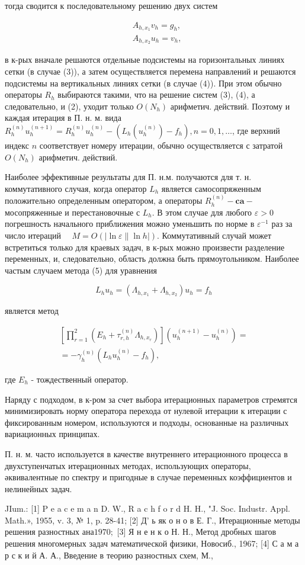 \documentclass[10pt]{article}
\begin{document}
тогда сводится к последовательному решению двух систем

\[
\begin{aligned}
& A_{h, x_{1}} v_{h}=g_{h}, \\
& A_{h, x_{2}} u_{h}=v_{h},
\end{aligned}
\]

в к-рых вначале решаются отдельные подсистемы на горизонтальных линиях сетки (в случае (3)), а затем осуществляется перемена направлений и решаются подсистемы на вертикальных линиях сетки (в случае (4)). При этом обычно операторы $R_{h}$ выбираются такими, что на решение систем (3), (4), а следовательно, и (2), уходит только $O\left(N_{h}\right)$ арифметич. действий. Поэтому и каждая итерация в П. н. м. вида $R_{h}^{(n)} u_{h}^{(n+1)}=R_{h}^{(n)} u_{h}^{(n)}-\left(L_{h}\left(u_{h}^{(n)}\right)-f_{h}\right), n=0,1, \ldots$, где верхний индекс $n$ соответствует номеру итерации, обычно осуществляется с затратой $O\left(N_{h}\right)$ арифметич. действий.

Наиболее эффективные результаты для П. н.м. получаются для т. н. коммутативного случая, когда оператор $L_{h}$ является самосопряженным положительно определенным оператором, а операторы $R_{h}^{(n)}-\mathbf{c a}-$ мосопряженные и перестановочные с $L_{h}$. В этом случае для любого $\varepsilon>0$ погрешность начального приближения можно уменьшить по норме в $\varepsilon^{-1}$ раз за число итераций $\quad M=O(|\ln \varepsilon \| \ln h|)$. Коммутативный случай может встретиться только для краевых задач, в к-рых можно произвести разделение переменных, и, следовательно, область должна быть прямоугольником. Наиболее частым случаем метода (5) для уравнения

\[
L_{h} u_{h}=\left(\Lambda_{h, x_{1}}+\Lambda_{h, x_{2}}\right) u_{h}=f_{h}
\]

является метод

\[
\begin{gathered}
{\left[\prod_{r=1}^{2}\left(E_{h}+\tau_{r, h}^{(n)} \Lambda_{h, x_{r}}\right)\right]\left(u_{h}^{(n+1)}-u_{h}^{(n)}\right)=} \\
=-\gamma_{h}^{(n)}\left(L_{h} u_{h}^{(n)}-f_{h}\right),
\end{gathered}
\]

где $E_{h}$ - тождественный оператор.

Наряду с подходом, в к-ром за счет выбора итерационных параметров стремятся минимизировать норму оператора перехода от нулевой итерации к итерации с фиксированным номером, используются и подходы, основанные на различных вариационных принципах.

П. н. м. часто используется в качестве внутреннего итерационного процесса в двухступенчатых итерационных методах, использующих операторы, әквивалентные по спектру и пригодные в случае переменных коэффициентов и нелинейных задач.

JIum.: [1] P e a c e m a n D. W., $\mathrm{R}$ a $\mathrm{c}$ h f o r d H. H., "J. Soc. Industr. Appl. Math.», 1955, v. 3, № 1, p. 28-41; [2] Д' ь як о н о в Е. Г., Итерационные методы решения разностных ана$1970 ;$ [3] Я н е н к о Н. Н., Метод дробных шагов решения многомерных задач математической физики, Новосиб., 1967; [4] С а м а р с к и й А. А., Введение в теорию разностных схем, М.,
\end{document}
